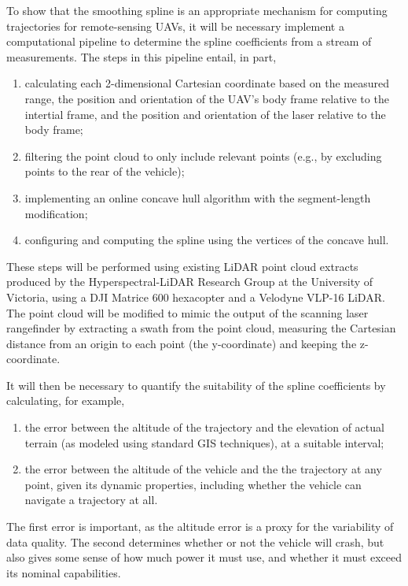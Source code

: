 \documentclass[doc]{apa6}
\begin{document}
To show that the smoothing spline is an appropriate mechanism for computing trajectories for remote-sensing UAVs, it will be necessary implement a computational pipeline to determine the spline coefficients from a stream of measurements. The steps in this pipeline entail, in part,

\begin{enumerate}
\item calculating each 2-dimensional Cartesian coordinate based on the measured range, the position and  orientation of the UAV's body frame relative to the intertial frame, and the position and orientation of the laser relative to the body frame;
\item filtering the point cloud to only include relevant points (e.g., by excluding points to the rear of the vehicle);
\item implementing an online concave hull algorithm with the segment-length modification;
\item configuring and computing the spline using the vertices of the concave hull.
\end{enumerate}

These steps will be performed using existing LiDAR point cloud extracts produced by the Hyperspectral-LiDAR Research Group at the University of Victoria, using a DJI Matrice 600 hexacopter and a Velodyne VLP-16 LiDAR. The point cloud will be modified to mimic the output of the scanning laser rangefinder by extracting a swath from the point cloud, measuring the Cartesian distance from an origin to each point (the y-coordinate) and keeping the z-coordinate.

It will then be necessary to quantify the suitability of the spline coefficients by calculating, for example,

\begin{enumerate}
\item the error between the altitude of the trajectory and the elevation of actual terrain (as modeled using standard GIS techniques), at a suitable interval;
\item the error between the altitude of the vehicle and the the trajectory at any point, given its dynamic properties, including whether the vehicle can navigate a trajectory at all.
\end{enumerate}

The first error is important, as the altitude error is a proxy for the variability of data quality. The second determines whether or not the vehicle will crash, but also gives some sense of how much power it must use, and whether it must exceed its nominal capabilities.
\end{document}
